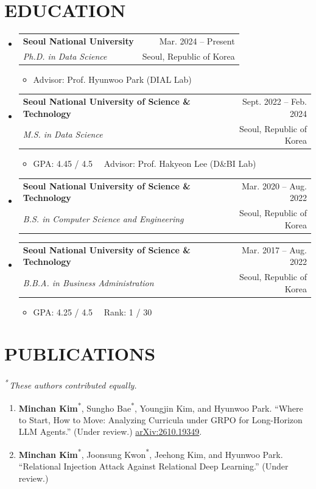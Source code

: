\documentclass[letterpaper,11pt]{article}
\makeatletter
\newcommand{\me}{\textbf{\textcolor{accent}{Minchan Kim}}}
\newcommand{\resumeItem}[1]{
  \item\small{
    {#1 \vspace{-1pt}}
  }
}
\newcommand{\resumeSubheading}[4]{
  \vspace{-1pt}\item
    \begin{tabular*}{\textwidth}[t]{l@{\extracolsep{\fill}}r}
      \textbf{#1} & {\color{dark-grey}\small #2}\vspace{1pt}\\ %
      \textit{#3} & {\color{dark-grey} \small #4}\\ %
    \end{tabular*}\vspace{-4pt}
}
\newcommand{\resumeSubHeadingListStart}{\begin{itemize}[leftmargin=0in, label={}]}
\newcommand{\resumeSubHeadingListEnd}{\end{itemize}}
\newcommand{\resumeItemListStart}{\begin{itemize}}
\newcommand{\resumeItemListEnd}{\end{itemize}\vspace{0pt}}
\newcommand{\cvsubsection}[1]{\vspace{3pt}\noindent{\small\textbf{#1}}\vspace{1pt}}
\newenvironment{pubList}
  {\begin{enumerate}[leftmargin=0.55cm, label=\arabic*., itemsep=2pt, topsep=2pt, parsep=0pt]\small}
  {\end{enumerate}\vspace{2pt}}
\makeatother
\begin{document}
\section{EDUCATION}
  \resumeSubHeadingListStart

    \resumeSubheading
      {Seoul National University}{Mar. 2024 -- Present}
      {Ph.D. in Data Science}{Seoul, Republic of Korea}
      \resumeItemListStart
        \resumeItem{Advisor: Prof. Hyunwoo Park (DIAL Lab)}
      \resumeItemListEnd

    \resumeSubheading
      {Seoul National University of Science \& Technology}{Sept. 2022 -- Feb. 2024}
      {M.S. in Data Science}{Seoul, Republic of Korea}
      \resumeItemListStart
        \resumeItem{GPA: 4.45 / 4.5 \, \textbar \, Advisor: Prof. Hakyeon Lee (D\&BI Lab)}
      \resumeItemListEnd

    \resumeSubheading
      {Seoul National University of Science \& Technology}{Mar. 2020 -- Aug. 2022}
      {B.S. in Computer Science and Engineering}{Seoul, Republic of Korea}

    \resumeSubheading
      {Seoul National University of Science \& Technology}{Mar. 2017 -- Aug. 2022}
      {B.B.A. in Business Administration}{Seoul, Republic of Korea}
      \resumeItemListStart
        \resumeItem{GPA: 4.25 / 4.5 \, \textbar \, Rank: 1 / 30}
      \resumeItemListEnd

  \resumeSubHeadingListEnd


\section{PUBLICATIONS}
\vspace{4pt}
{\small\textit{\textsuperscript{*}\,These authors contributed equally.}}

\cvsubsection{Working Papers}
\begin{pubList}
  \item \me\textsuperscript{*}, Sungho Bae\textsuperscript{*}, Youngjin Kim, and Hyunwoo Park. ``Where to Start, How to Move: Analyzing Curricula under GRPO for Long-Horizon LLM Agents.'' (Under review.) \href{https://arxiv.org/abs/2610.19349}{arXiv:2610.19349}.
  \item \me\textsuperscript{*}, Joonsung Kwon\textsuperscript{*}, Jeehong Kim, and Hyunwoo Park. ``Relational Injection Attack Against Relational Deep Learning.'' (Under review.)
\end{pubList}
\end{document}
